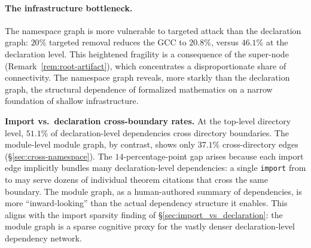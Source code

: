 \paragraph{The infrastructure bottleneck.} The namespace graph is more vulnerable to targeted attack than the declaration graph: $20\%$ targeted removal reduces the GCC to $20.8\%$, versus $46.1\%$ at the declaration level. This heightened fragility is a consequence of the  super-node (Remark~\ref{rem:root-artifact}), which concentrates a disproportionate share of connectivity. The namespace graph reveals, more starkly than the declaration graph, the structural dependence of formalized mathematics on a narrow foundation of shallow infrastructure.

\noindent\textbf{Import vs.\ declaration cross-boundary rates.}
\label{rem:import-vs-decl-cross}
At the top-level directory level, $51.1\%$ of declaration-level dependencies cross directory boundaries. The module-level module graph, by contrast, shows only $37.1\%$ cross-directory edges (\S\ref{sec:cross-namespace}). The $14$-percentage-point gap arises because each import edge implicitly bundles many declaration-level dependencies: a single \texttt{import} from  to  may serve dozens of individual theorem citations that cross the same boundary. The module graph, as a human-authored summary of dependencies, is more ``inward-looking'' than the actual dependency structure it enables. This aligns with the import sparsity finding of \S\ref{sec:import_vs_declaration}: the module graph is a sparse cognitive proxy for the vastly denser declaration-level dependency network.
